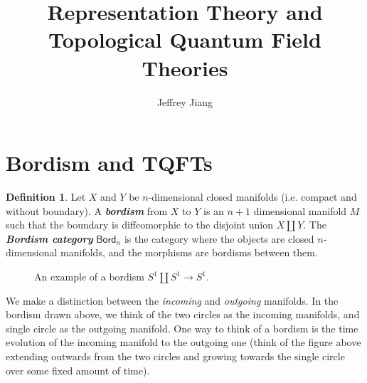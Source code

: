 \documentclass[psamsfonts, 11pt]{amsart}
\newcommand{\incfig}[2]{%
    \fontsize{48pt}{50pt}\selectfont
    \def\svgwidth{\columnwidth}
    \scalebox{#2}{}
}
\theoremstyle{definition}
\newtheorem{defn}[thm]{Definition}
\theoremstyle{remark}
\newcommand{\Bord}{\mathsf{Bord}}
\newcommand{\ib}[1]{\textbf{\textit{#1}}}
\begin{document}
%
\author{Jeffrey Jiang}
%
\title{Representation Theory and Topological Quantum Field Theories}
%
\maketitle
%
\section{Bordism and TQFTs}
%
\begin{defn}
Let $X$ and $Y$ be $n$-dimensional closed manifolds (i.e. compact and without boundary).
A \ib{bordism} from $X$ to $Y$ is an $n+1$ dimensional manifold $M$ such that
the boundary is diffeomorphic to the disjoint union $X \coprod Y$. The
\ib{Bordism category} $\Bord_n$ is the category where the objects are closed
$n$-dimensional manifolds, and the morphisms are bordisms between them.
\end{defn}
%
\begin{figure}[ht]
  \centering
  \incfig{bordism}{0.20}
  \caption{An example of a bordism $S^1 \coprod S^1 \to S^1$.}
\end{figure}
%
We make a distinction between the \emph{incoming} and \emph{outgoing} manifolds.
In the bordism drawn above, we think of the two circles as the incoming manifolds,
and single circle as the outgoing manifold. One way to think of a bordism is
the time evolution of the incoming manifold to the outgoing one (think of the
figure above extending outwards from the two circles and growing towards the
single circle over some fixed amount of time). \\
\end{document}
